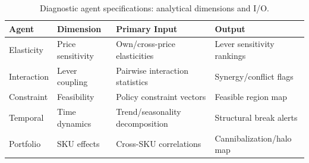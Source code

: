 \begin{table}[ht]
\centering
\caption{Diagnostic agent specifications: analytical dimensions and I/O.}
\label{tab:agents}
\small
\begin{tabular}{llp{3.5cm}p{3.5cm}}
\toprule
\textbf{Agent} & \textbf{Dimension} & \textbf{Primary Input} & \textbf{Output} \\
\midrule
Elasticity & Price sensitivity & Own/cross-price elasticities & Lever sensitivity rankings \\
Interaction & Lever coupling & Pairwise interaction statistics & Synergy/conflict flags \\
Constraint & Feasibility & Policy constraint vectors & Feasible region map \\
Temporal & Time dynamics & Trend/seasonality decomposition & Structural break alerts \\
Portfolio & SKU effects & Cross-SKU correlations & Cannibalization/halo map \\
\bottomrule
\end{tabular}
\end{table}